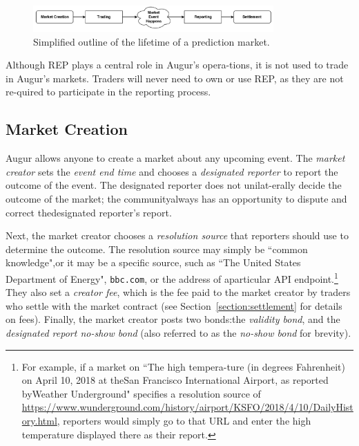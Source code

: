 \documentclass[12pt,floatfix,reprint,nofootinbib,amsmath,amssymb,epsfig,pre,floats,letterpaper,groupedaffiliation]{revtex4-1}
\theoremstyle{definition}
\theoremstyle{definition}
\begin{document}
\vspace{0pt plus 20pt}

\begin{figure}
\includegraphics[width=0.82\textwidth]{1.pdf}
\caption{Simplified outline of the lifetime of a prediction market.}
\label{fig:overview}
\end{figure}

Although REP plays a central role in Augur's opera-\linebreak tions, it is not used to trade in Augur's markets. Traders will never need to own or use REP, as they are not re-\linebreak quired to participate in the reporting process.\pagebreak



\subsection{Market Creation}

Augur allows anyone to create a market about any upcoming event. The \textit{market creator} sets the \textit{event end time} and chooses a \textit{designated reporter} to report the outcome of the event. The designated reporter does not unilat-\linebreak erally decide the outcome of the market; the community\linebreak always has an opportunity to dispute and correct the\linebreak designated reporter's report.

Next, the market creator chooses a \textit{resolution source} that reporters should use to determine the outcome. The resolution source may simply be ``common knowledge",\linebreak or it may be a specific source, such as ``The United States Department of Energy", \texttt{bbc.com}, or the address of a\linebreak particular API endpoint.\footnote{For example, if a market on ``The high tempera-\linebreak ture (in degrees Fahrenheit) on April 10, 2018 at the\linebreak San Francisco International Airport, as reported by\linebreak Weather Underground" specifies a resolution source of \url{https://www.wunderground.com/history/airport/KSFO/2018/4/10/DailyHistory.html}, reporters would simply go to that URL and enter the high temperature displayed there as their report.} They also set a \textit{creator fee}, which is the fee paid to the market creator by traders who settle with the market contract (see Section~\ref{section:settlement} for details on fees). Finally, the market creator posts two bonds:\linebreak the \textit{validity bond}, and the \textit{designated report no-show bond} (also referred to as the \textit{no-show bond} for brevity).
\end{document}
